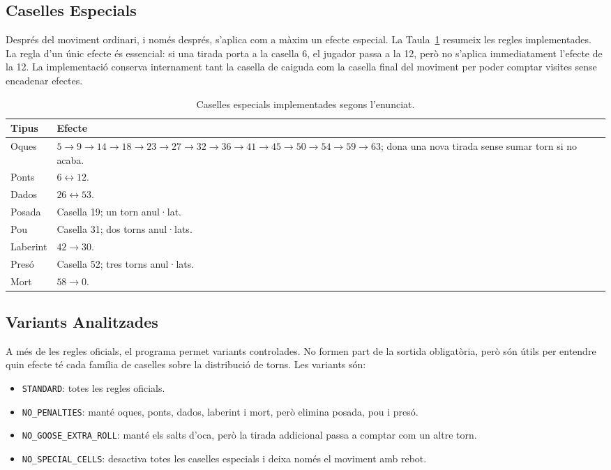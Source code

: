 \documentclass[conference,compsoc]{IEEEtran}
\begin{document}
\subsection{Caselles Especials}

Després del moviment ordinari, i només després, s'aplica com a màxim un efecte
especial. La Taula~\ref{tab:regles} resumeix les regles implementades. La regla
d'un únic efecte és essencial: si una tirada porta a la casella 6, el jugador passa
a la 12, però no s'aplica immediatament l'efecte de la 12. La implementació
conserva internament tant la casella de caiguda com la casella final del moviment
per poder comptar visites sense encadenar efectes.

\begin{table}[H]
\centering
\caption{Caselles especials implementades segons l'enunciat.}
\label{tab:regles}
\footnotesize
\begin{tabular}{@{}p{}p{}@{}}
\toprule
Tipus & Efecte \\
\midrule
Oques & $5\to9\to14\to18\to23\to27\to32\to36\to41\to45\to50\to54\to59\to63$; dona una nova tirada sense sumar torn si no acaba. \\
Ponts & $6\leftrightarrow12$. \\
Dados & $26\leftrightarrow53$. \\
Posada & Casella 19; un torn anul·lat. \\
Pou & Casella 31; dos torns anul·lats. \\
Laberint & $42\to30$. \\
Presó & Casella 52; tres torns anul·lats. \\
Mort & $58\to0$. \\
\bottomrule
\end{tabular}
\end{table}

\subsection{Variants Analitzades}

A més de les regles oficials, el programa permet variants controlades. No formen
part de la sortida obligatòria, però són útils per entendre quin efecte té cada
família de caselles sobre la distribució de torns. Les variants són:
\begin{itemize}
    \item \texttt{STANDARD}: totes les regles oficials.
    \item \texttt{NO\_PENALTIES}: manté oques, ponts, dados, laberint i mort, però
    elimina posada, pou i presó.
    \item \texttt{NO\_GOOSE\_EXTRA\_ROLL}: manté els salts d'oca, però la tirada
    addicional passa a comptar com un altre torn.
    \item \texttt{NO\_SPECIAL\_CELLS}: desactiva totes les caselles especials i
    deixa només el moviment amb rebot.
\end{itemize}
\end{document}

